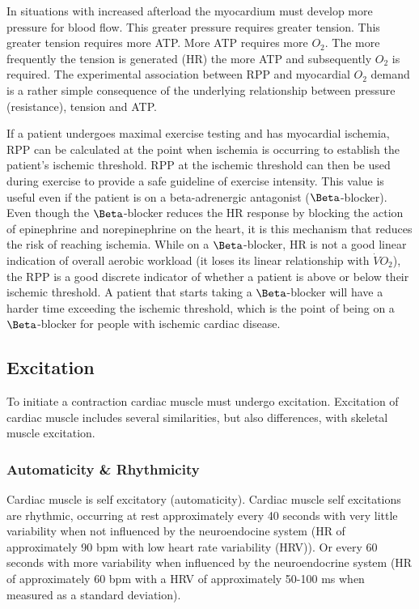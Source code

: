 In situations with increased afterload the myocardium must develop more pressure for blood flow. This greater pressure requires greater tension. This greater tension requires more ATP. More ATP requires more $O_2$. The more frequently the tension is generated (HR) the more ATP and subsequently $O_2$ is required. The experimental association between RPP and myocardial $O_2$ demand is a rather simple consequence of the underlying relationship between pressure (resistance), tension and ATP.

If a patient undergoes maximal exercise testing and has myocardial ischemia, RPP can be calculated at the point when ischemia is occurring to establish the patient’s ischemic threshold. RPP at the ischemic threshold can then be used during exercise to provide a safe guideline of exercise intensity. This value is useful even if the patient is on a beta-adrenergic antagonist ($\Beta$-blocker). Even though the $\Beta$-blocker reduces the HR response by blocking the action of epinephrine and norepinephrine on the heart, it is this mechanism that reduces the risk of reaching ischemia. While on a $\Beta$-blocker, HR is not a good linear indication of overall aerobic workload (it loses its linear relationship with $\dot{V}O_2$), the RPP is a good discrete indicator of whether a patient is above or below their ischemic threshold. A patient that starts taking a $\Beta$-blocker will have a harder time exceeding the ischemic threshold, which is the point of being on a $\Beta$-blocker for people with ischemic cardiac disease. 


\subsection{Excitation}

To initiate a contraction cardiac muscle must undergo excitation. Excitation of cardiac muscle includes several similarities, but also differences, with skeletal muscle excitation. 

\subsubsection{Automaticity \& Rhythmicity}

Cardiac muscle is self excitatory (automaticity). Cardiac muscle self excitations are rhythmic, occurring at rest approximately every 40 seconds with very little variability when not influenced by the neuroendocine system (HR of approximately 90 bpm with low heart rate variability (HRV)). Or every 60 seconds with more variability when influenced by the neuroendocrine system (HR of approximately 60 bpm with a HRV of approximately 50-100 ms when measured as a standard deviation).

